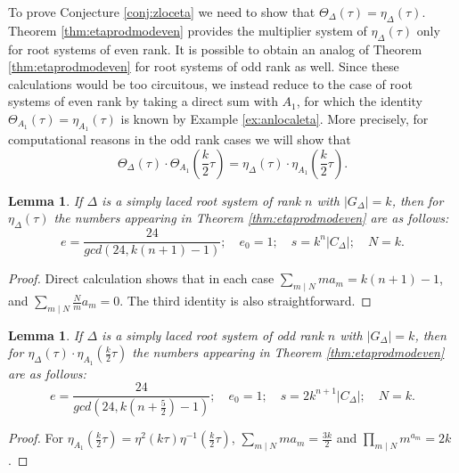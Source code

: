 \documentclass[11pt,a4paper]{amsart}
\newtheorem{lemma}[theorem]{Lemma}
\theoremstyle{definition}
\begin{document}
To prove Conjecture \ref{conj:zloceta} we need to show that $\Theta_{\Delta}(\tau)=\eta_{\Delta}(\tau)$. Theorem \ref{thm:etaprodmodeven} provides the multiplier system of $\eta_{\Delta}(\tau)$ only for root systems of even rank. It is possible to obtain an analog of Theorem \ref{thm:etaprodmodeven} for root systems of odd rank as well. Since these calculations would be too circuitous, we instead reduce to the case of root systems of even rank by taking a direct sum with $A_1$, for which the identity $\Theta_{A_1}(\tau)=\eta_{A_1}(\tau)$ is known by Example \ref{ex:anlocaleta}. More precisely, for computational reasons in the odd rank cases we will show that
\[\Theta_{\Delta}(\tau)\cdot \Theta_{A_1}\left(\frac{k}{2}\tau\right)=\eta_{\Delta}(\tau)\cdot \eta_{A_1}\left(\frac{k}{2}\tau\right).\]	
\begin{lemma}
\label{lem:ee0s}
If $\Delta$ is a simply laced root system of rank $n$ with $|G_{\Delta}|=k$, then for $\eta_{\Delta}(\tau)$ the numbers appearing in Theorem \ref{thm:etaprodmodeven}	 are as follows:
\[ e=\frac{24}{gcd(24, k(n+1)-1)}; \quad e_0=1; \quad s=k^n|C_{\Delta}|; \quad N=k. \]
\end{lemma}
\begin{proof} Direct calculation shows that in each case $\sum_{m \mid N} ma_m=k(n+1)-1$, and $\sum_{m \mid N} \frac{N}{m}a_m=0$. The third identity is also straightforward.
\end{proof}
\begin{lemma}
\label{lem:ee0sa1}
 If $\Delta$ is a simply laced root system of odd rank $n$ with $|G_{\Delta}|=k$, then for $\eta_{\Delta}(\tau) \cdot \eta_{A_1}(\frac{k}{2}\tau)$ the numbers appearing in Theorem \ref{thm:etaprodmodeven} are as follows:
\[ e=\frac{24}{gcd(24, k(n+\frac{5}{2})-1)}; \quad e_0=1; \quad s=2k^{n+1}|C_{\Delta}|; \quad N=k. \]
\end{lemma}
\begin{proof} For $\eta_{A_1}(\frac{k}{2}\tau)=\eta^2(k\tau)\eta^{-1}(\frac{k}{2}\tau)$, $\sum_{m \mid N} ma_m=\frac{3k}{2}$ and $\prod_{m \mid N} m^{a_m}=2k$. \end{proof}
\end{document}
